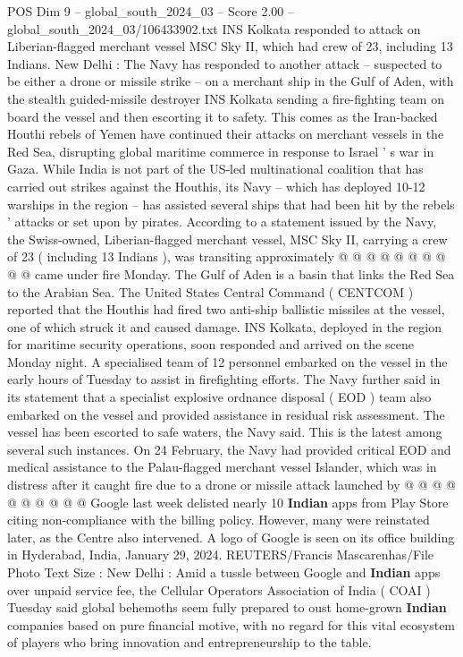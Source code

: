 \begin{textsample}{POS Dim 9 – global\_south\_2024\_03 – Score 2.00 – global\_south\_2024\_03/106433902.txt}  \label{ex:f9_pos_066}
INS Kolkata responded to attack on Liberian-flagged merchant vessel MSC Sky II, which had crew of 23, including 13 Indians.
New Delhi : The Navy has responded to another attack -- suspected to be either a drone or missile strike -- on a merchant ship in the Gulf of Aden, with the stealth guided-missile destroyer INS Kolkata sending a fire-fighting team on board the vessel and then escorting it to safety.
This comes as the Iran-backed Houthi rebels of Yemen have continued their attacks on merchant vessels in the Red Sea, disrupting global maritime commerce in response to Israel ' s war in Gaza.
While India is not part of the US-led multinational coalition that has carried out strikes against the Houthis, its Navy -- which has deployed 10-12 warships in the region -- has assisted several ships that had been hit by the rebels ' attacks or set upon by pirates.
According to a statement issued by the Navy, the Swiss-owned, Liberian-flagged merchant vessel, MSC Sky II, carrying a crew of 23 ( including 13 Indians ), was transiting approximately @ @ @ @ @ @ @ @ @ @ came under fire Monday.
The Gulf of Aden is a basin that links the Red Sea to the Arabian Sea.
The United States Central Command ( CENTCOM ) reported that the Houthis had fired two anti-ship ballistic missiles at the vessel, one of which struck it and caused damage.
INS Kolkata, deployed in the region for maritime security operations, soon responded and arrived on the scene Monday night.
A specialised team of 12 personnel embarked on the vessel in the early hours of Tuesday to assist in firefighting efforts.
The Navy further said in its statement that a specialist explosive ordnance disposal ( EOD ) team also embarked on the vessel and provided assistance in residual risk assessment.
The vessel has been escorted to safe waters, the Navy said.
This is the latest among several such instances.
On 24 February, the Navy had provided critical EOD and medical assistance to the Palau-flagged merchant vessel Islander, which was in distress after it caught fire due to a drone or missile attack launched by @ @ @ @ @ @ @ @ @ @ Google last week delisted nearly 10 \textbf{Indian} apps from Play Store citing non-compliance with the billing policy.
However, many were reinstated later, as the Centre also intervened.
A logo of Google is seen on its office building in Hyderabad, India, January 29, 2024.
REUTERS/Francis Mascarenhas/File Photo Text Size : New Delhi : Amid a tussle between Google and \textbf{Indian} apps over unpaid service fee, the Cellular Operators Association of India ( COAI ) Tuesday said global behemoths seem fully prepared to oust home-grown \textbf{Indian} companies based on pure financial motive, with no regard for this vital ecosystem of players who bring innovation and entrepreneurship to the table.

\end{textsample}
